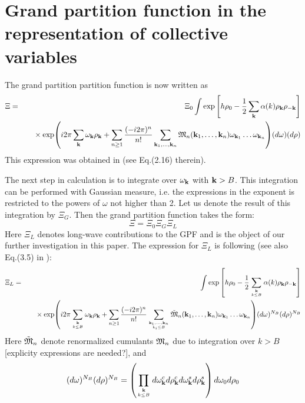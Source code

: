 \section{Grand partition function in the representation of collective variables}
The grand partition partition function is now written as 
\begin{eqnarray}
	\label{gpf_1}
	\Xi &=& \Xi_0 \int \exp \left[h \rho_0 - \frac12
	\sum\limits_{\bf k} \alpha (k) \rho_{\bf k}\rho_{-{\bf k}} \right]
	\\
	&&
	\quad{}\times
	\exp (i2\pi \sum\limits_{\bf k} \omega_{\bf k} \rho_{\bf k} + \sum_{n\ge 1} \frac{(-i2\pi)^n}{n!}\sum_{\vb{k}_1,\dotsc,\vb{k}_n} {\mathfrak M}_n(\vb{k}_1,\dotsc,\vb{k}_n) \omega_{\vb k_1}\dotsc\omega_{\vb{k}_n})
	(d\omega) (d\rho) \nonumber
\end{eqnarray}
This expression was obtained in \cite{Yukh1990} (see Eq.(2.16) therein).

The next step in calculation is to integrate over $\omega_{\vb k}$ with $\vb{k}>B$. This integration can be performed with Gaussian measure, i.e. the expressions in the exponent is restricted to the powers of $\omega$ not higher than 2. Let us denote the result of this integration by $\Xi_G$. Then the grand partition function takes the form:
\begin{equation}
	\label{Xi_as_prod}
	\Xi = \Xi_0\Xi_G\Xi_L
\end{equation}
Here $\Xi_L$ denotes long-wave contributions to the GPF and is the object of our further investigation in this paper. The expression for $\Xi_L$ is following (see also Eq.(3.5) in \cite{Yukh1990}):
\begin{eqnarray}
	\label{gpf_l1}
	\Xi_L &=& \int \exp \left[h \rho_0 - \frac12
	\sum\limits_{\vb k \atop k\le B} \alpha (k) \rho_{\vb k}\rho_{-{\vb k}} \right]
	\\
	&&
	\quad{}\times
	\exp (i2\pi \sum\limits_{\vb k \atop k\le B} \omega_{\vb k} \rho_{\vb k} + \sum_{n\ge 1} \frac{(-i2\pi)^n}{n!}\sum_{\vb{k}_1,\dotsc,\vb{k}_n \atop k_i\le B} \tilde{\frak M}_n(\vb{k}_1,\dotsc,\vb{k}_n) \omega_{\vb k_1}\dotsc\omega_{\vb{k}_n})
	(d\omega)^{N_B} (d\rho)^{N_B} \nonumber
\end{eqnarray}
Here $\tilde{\frak M}_n$ denote renormalized cumulants ${\frak M}_n$ due to integration over $k>B$ [explicity expressions are needed?], and
\begin{equation}
(d\omega)^{N_B} (d\rho)^{N_B} = \left(\prod_{\vb k\atop k\le B}d\omega_{\vb k}^c d\rho_{\vb k}^c d\omega_{\vb k}^s d\rho_{\vb k}^s \right) d\omega_0 d\rho_0
\end{equation}

